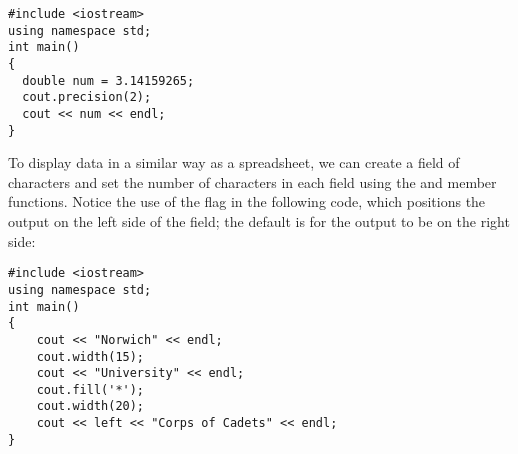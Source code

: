 \begin{lstlisting}
#include <iostream>
using namespace std;
int main()
{
  double num = 3.14159265;
  cout.precision(2);
  cout << num << endl;
}
\end{lstlisting}

\noindent {}

To display data in a similar way as a spreadsheet, we can create a field of characters and set the number of characters in each field using the  and  member functions. 
Notice the use of the  flag in the following code, which positions the output on the left side of the field; the default is for the output to be on the right side:

\begin{lstlisting}
#include <iostream>
using namespace std;
int main()
{
	cout << "Norwich" << endl;
	cout.width(15);
	cout << "University" << endl;
	cout.fill('*');
	cout.width(20);
	cout << left << "Corps of Cadets" << endl;
}
\end{lstlisting}

\noindent {}
\noindent {}
\noindent {}

